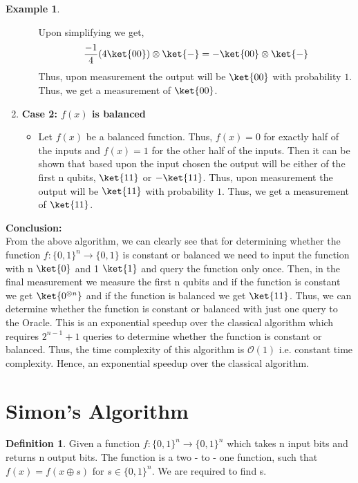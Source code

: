 \documentclass[12pt, oneside]{book}
\theoremstyle{definition}
\newtheorem{definition}{Definition}[section]
\theoremstyle{definition}
\newtheorem{example}{Example}[section]
\theoremstyle{remark}
\begin{document}
\begin{example}
\begin{enumerate}
\begin{itemize}
\[            \]
            Upon simplifying we get,
            \[
                \frac{-1}{4}(4\ket{00})\otimes \ket{-}=-\ket{00}\otimes \ket{-}
            \]
            Thus, upon measurement the output will be $\ket{00}$ with probability $1$. Thus, we get a measurement of $\ket{00}$.
        \end{itemize}
        \item \textbf{Case 2: $f(x)$ is balanced}\\
        \begin{itemize}
            \item Let $f(x)$ be a balanced function. Thus, $f(x)=0$ for exactly half of the inputs and $f(x)=1$ for the other half of the inputs.
            Then it can be shown that based upon the input chosen the output will be either of the first n qubits, $\ket{11}$ or $-\ket{11}$.
            Thus, upon measurement the output will be $\ket{11}$ with probability $1$. Thus, we get a measurement of $\ket{11}$.
        \end{itemize}
    \end{enumerate}
\end{example}
\textbf{Conclusion: }\\
From the above algorithm, we can clearly see that for determining whether the 
function $f:\{0,1\}^n \rightarrow \{0,1\}$ is constant or balanced we need to input the function with n $\ket{0}$ and 1 $\ket{1}$ and query the function only once.
Then, in the final measurement we measure the first n qubits and if the function is constant we get $\ket{0^{\otimes n}}$ and if the function is balanced we get $\ket{11}$.
Thus, we can determine whether the function is constant or balanced with just one query to the Oracle. This is an exponential speedup over the classical algorithm which requires $2^{n-1}+1$ queries to determine whether the function is constant or balanced.
Thus, the time complexity of this algorithm is $\mathcal{O}(1)$ i.e. constant time complexity. Hence, an exponential speedup over the classical algorithm.

\section{Simon's Algorithm}
\begin{definition}
    Given a function $f:\{0,1\}^n \rightarrow \{0,1\}^n$ which takes n input bits and returns n output bits.
    The function is a two - to - one function, such that $f(x)=f(x\oplus s)$ for $s \in \{0,1\}^n$.
    We are required to find s.
\end{definition}
\end{document}
